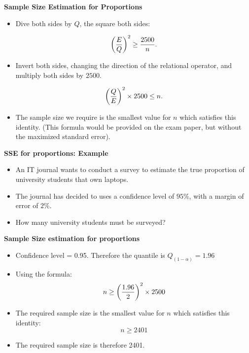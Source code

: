 \documentclass[]{report}
\begin{document}

\textbf{Sample Size Estimation for Proportions}

\begin{itemize}

\item  Dive both sides by $Q$, the square both sides:

\[ \left({E\over Q}\right)^2 \geq {2500 \over n}. \]

\item  Invert both sides, changing the direction of the relational operator, and multiply both sides by $2500$.

\[ \left({Q\over E}\right)^2 \times 2500 \leq n. \]

\item  The sample size we require is the smallest value for $n$ which satisfies this identity. (This formula would be provided on the exam paper, but without the maximized standard error).
\end{itemize}


\textbf{SSE for proportions: Example}
\begin{itemize}
\item  An IT journal wants to conduct a survey to estimate the true proportion of university students that own laptops.
\item  The journal has decided to uses a confidence level of $95\%$, with a margin of error of $2\%$.
\item  How many university students must be surveyed?
\end{itemize}



\textbf{Sample Size estimation for proportions}

\begin{itemize}
\item  Confidence level = 0.95. Therefore the quantile is $Q_{(1-\alpha)} = 1.96$
\item  Using the formula: \[ n \geq \left({1.96 \over 2 }\right)^2 \times 2500  \]
\item  The required sample size is the smallest value for $n$ which satisfies this identity: \[ n \geq 2401  \]
\item  The required sample size is therefore 2401.
\end{itemize}
\end{document}
